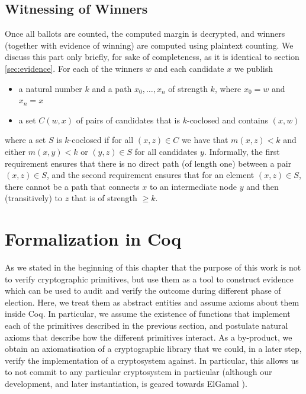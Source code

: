 \subsection{Witnessing of Winners}
Once all ballots are counted, the computed margin is decrypted, and
winners (together with evidence of winning) are computed using 
plaintext counting. We discuss this part only briefly, for sake of completeness,
 as it is identical to section \ref{sec:evidence}.
 For each of the winners $w$ and each
candidate $x$ we publish
\begin{itemize}
\item a natural number $k$ and a path $x_0, \dots, x_n $ of strength $k$, where $x_0 = w$ 
and $x_n = x$
\item a set $C(w, x)$ of pairs of candidates that is $k$-coclosed
and contains $(x, w)$
\end{itemize}
where a set $S$ is  $k$-coclosed if for all $(x,z) \in C$ we have
that $m(x, z) < k$ and either $m(x, y) < k$ or $(y,z) \in S$ for
all candidates $y$.  Informally, the first requirement ensures that
there is no direct path (of length one) between a pair $(x, z) \in
S$, and the second requirement ensures that for an element $(x, z)
\in S$, there cannot be a path that connects $x$ to an intermediate
node $y$ and then (transitively) to $z$ that is of strength $\geq
k$.


\section{Formalization in Coq} \label{sec:realisation}



As we stated in the beginning of this chapter that the purpose of this work is
not to verify cryptographic primitives, 
but use them as a tool to construct evidence which can be used 
to audit and verify the outcome during different phase 
of election. Here, we treat them as abstract entities and assume
axioms about them inside Coq.
In particular, we assume the existence of functions that implement
each of the primitives described in the previous section, and
postulate natural axioms that describe how the different primitives
interact. As a by-product, we obtain an axiomatisation of a
cryptographic library that we could, in a later step, verify the
implementation of a cryptosystem against.  In particular, this
allows us to not commit to any particular cryptosystem in particular
(although our development, and later instantiation, is geared
towards ElGamal \citep{elgamal1985public}).

